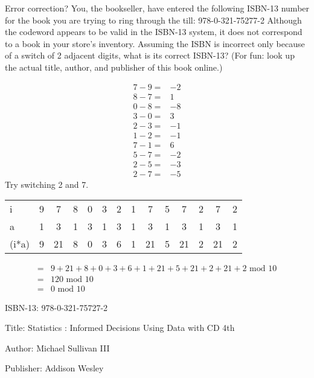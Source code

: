 \begin{question}{2}
Error correction? You, the bookseller, have entered the following ISBN-13 number for
the book you are trying to ring through the till:
978-0-321-75277-2
Although the codeword appears to be valid in the ISBN-13 system, it does not correspond
to a book in your store's inventory. Assuming the ISBN is incorrect only because of a switch
of 2 adjacent digits, what is its correct ISBN-13?
(For fun: look up the actual title, author, and publisher of this book online.)

\begin{align*}
7-9 =&-2\\
8-7 =& 1\\
0-8 =& -8\\
3-0=&3\\
2-3=&-1\\
1-2=&-1\\
7-1=&6\\
5-7=&-2\\
2-5=&-3\\
2-7=&-5
\end{align*}
Try switching 2 and 7.

\begin{tabular}{l|ccccccccccccc}
\hline
i     & 9  & 7  & 8  & 0  & 3  & 2  & 1  & 7  & 5  & 7 & 2 & 7 & 2\\
a     & 1  & 3  & 1  & 3  & 1  & 3  & 1  & 3  & 1  & 3 & 1 & 3 & 1 \\ 
\hline
(i*a) & 9  & 21 & 8  & 0  & 3  & 6  & 1  & 21 & 5  & 21& 2 &21 & 2
\end{tabular}

\begin{align*}
=& 9  + 21 + 8  + 0  + 3  + 6  + 1  + 21 + 5  + 21+ 2 +21 + 2 \textrm{ mod } 10\\
=& 120 \textrm{ mod } 10\\
=& 0 \textrm{ mod } 10
\end{align*}

ISBN-13: 978-0-321-75727-2

Title: Statistics : Informed Decisions Using Data with CD 4th

Author: Michael Sullivan III

Publisher: Addison Wesley

\end{question}


